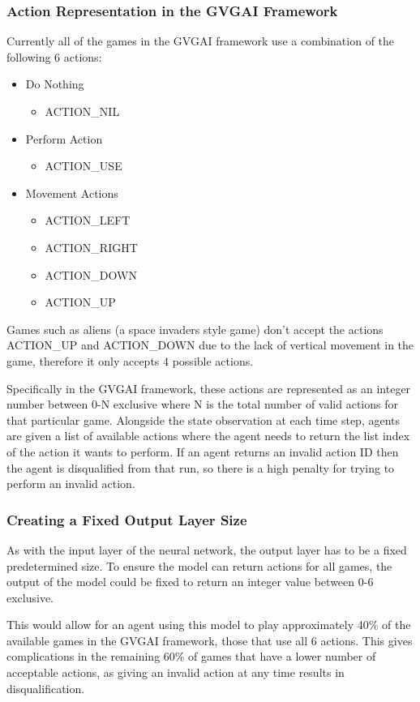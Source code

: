 \subsubsection{Action Representation in the GVGAI Framework}
Currently all of the games in the GVGAI framework use a combination of the following 6 actions:
\begin{multicols}{2}
\begin{itemize}
    \item Do Nothing
    \begin{itemize}
        \item ACTION\_NIL
    \end{itemize}
    \item Perform Action
    \begin{itemize}
        \item ACTION\_USE
    \end{itemize}
    \item Movement Actions
    \begin{itemize}
        \item ACTION\_LEFT
        \item ACTION\_RIGHT
        \item ACTION\_DOWN
        \item ACTION\_UP
    \end{itemize}
\end{itemize}
\end{multicols}
Games such as aliens (a space invaders style game) don't accept the actions ACTION\_UP and ACTION\_DOWN due to the lack of vertical movement in the game, therefore it only accepts 4 possible actions.
\par
Specifically in the GVGAI framework, these actions are represented as an integer number between 0-N exclusive where N is the total number of valid actions for that particular game.
Alongside the state observation at each time step, agents are given a list of available actions where the agent needs to return the list index of the action it wants to perform.
If an agent returns an invalid action ID then the agent is disqualified from that run, so there is a high penalty for trying to perform an invalid action.

\subsubsection{Creating a Fixed Output Layer Size}
As with the input layer of the neural network, the output layer has to be a fixed predetermined size.
To ensure the model can return actions for all games, the output of the model could be fixed to return an integer value between 0-6 exclusive.
\par
This would allow for an agent using this model to play approximately 40\% of the available games in the GVGAI framework, those that use all 6 actions.
This gives complications in the remaining 60\% of games that have a lower number of acceptable actions, as giving an invalid action at any time results in disqualification.
